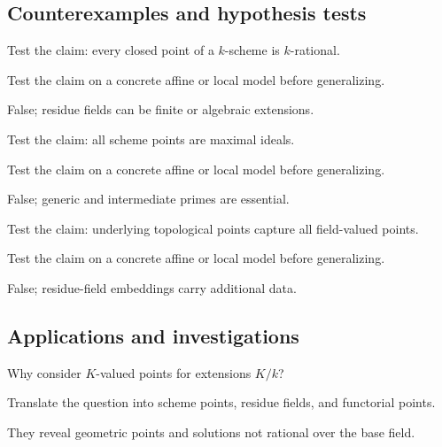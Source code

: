 \subsection*{Counterexamples and hypothesis tests}

\begin{exercise}\label{exr:vi21-expand-10}
Test the claim: every closed point of a $k$-scheme is $k$-rational.
\end{exercise}
\begin{hint}
Test the claim on a concrete affine or local model before generalizing.
\end{hint}
\begin{solution}
False; residue fields can be finite or algebraic extensions.
\end{solution}

\begin{exercise}\label{exr:vi21-expand-11}
Test the claim: all scheme points are maximal ideals.
\end{exercise}
\begin{hint}
Test the claim on a concrete affine or local model before generalizing.
\end{hint}
\begin{solution}
False; generic and intermediate primes are essential.
\end{solution}

\begin{exercise}\label{exr:vi21-expand-12}
Test the claim: underlying topological points capture all field-valued points.
\end{exercise}
\begin{hint}
Test the claim on a concrete affine or local model before generalizing.
\end{hint}
\begin{solution}
False; residue-field embeddings carry additional data.
\end{solution}

\subsection*{Applications and investigations}

\begin{exercise}\label{exr:vi21-expand-13}
Why consider $K$-valued points for extensions $K/k$?
\end{exercise}
\begin{hint}
Translate the question into scheme points, residue fields, and functorial points.
\end{hint}
\begin{solution}
They reveal geometric points and solutions not rational over the base field.
\end{solution}

